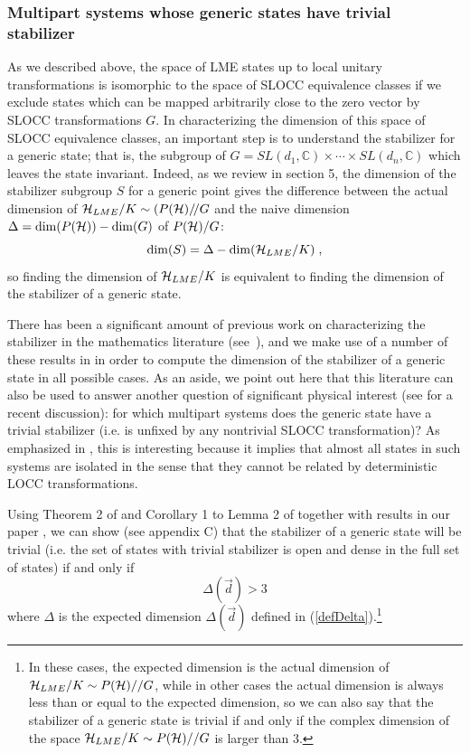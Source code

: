\documentclass[12pt]{article}
\theoremstyle{definition}
\newcommand{\be}{\begin{equation}}
\newcommand{\ee}{\end{equation}}
\newcommand{\GITquot}{/\!/}
\begin{document}
\subsubsection*{Multipart systems whose generic states have trivial stabilizer}

As we described above, the space of LME states up to local unitary transformations is isomorphic to the space of SLOCC equivalence classes if we exclude states which can be mapped arbitrarily close to the zero vector by SLOCC transformations $G$. In characterizing the dimension of this space of SLOCC equivalence classes, an important step is to understand the stabilizer for a generic state; that is, the subgroup of $G = SL(d_1, \mathbb{C}) \times \cdots \times SL(d_n, \mathbb{C})$ which leaves the state invariant. Indeed, as we review in section 5, the dimension of the stabilizer subgroup $S$ for a generic point gives the difference between the actual dimension of ${\cal H}_{LME}/K \sim (P({\cal H}) \GITquot G$ and the naive dimension $\Delta = {\rm dim}(P({\cal H})) - {\rm dim}(G)$ of $P({\cal H})/G$: 
\be
{\rm dim}(S) = 
\Delta - {\rm dim}({\cal H}_{LME}/K) \; ,
\ee
so finding the dimension of ${\cal H}_{LME}/K$ is equivalent to finding the dimension of the stabilizer of a generic state.

There has been a significant amount of previous work on characterizing the stabilizer in the mathematics literature (see~\cite{elashvili, ampopov}), and we make use of a number of these results in \cite{mathpaper} in order to compute the dimension of the stabilizer of a generic state in all possible cases. As an aside, we point out here that this literature can also be used to answer another question of significant physical interest (see \cite{SWGK} for a recent discussion): for which multipart systems does the generic state have a trivial stabilizer (i.e. is unfixed by any nontrivial SLOCC transformation)? As emphasized in \cite{GKW,SWGK}, this is interesting because it implies that almost all states in such systems are isolated in the sense that they cannot be related by deterministic LOCC transformations.

Using Theorem 2 of \cite{ampopov} and Corollary 1 to Lemma 2 of \cite{elashvili} together with results in our paper \cite{mathpaper}, we can show (see appendix C) that the stabilizer of a generic state will be trivial (i.e. the set of states with trivial stabilizer is open and dense in the full set of states) if and only if 
\be
\Delta(\vec{d}) > 3
\ee
where $\Delta$ is the expected dimension $\Delta(\vec{d})$ defined in (\ref{defDelta}).\footnote{In these cases, the expected dimension is the actual dimension of ${\cal H}_{LME}/K \sim P({\cal H})//G$, while in other cases the actual dimension is always less than or equal to the expected dimension, so we can also say that the stabilizer of a generic state is trivial if and only if the complex dimension of the space  ${\cal H}_{LME}/K \sim P({\cal H})//G$ is larger than 3.}
\end{document}
